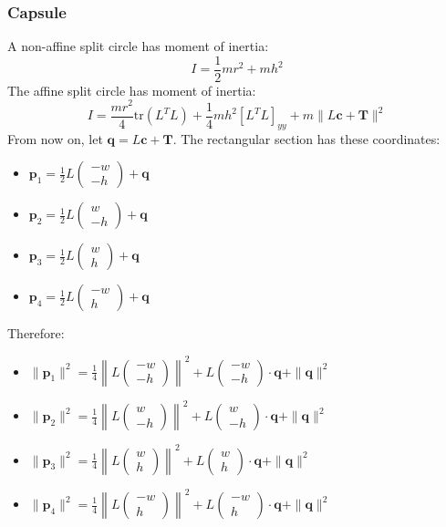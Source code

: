 \documentclass[10pt]{report}
\newcommand{\mat}[1]{\begin{pmatrix} #1 \end{pmatrix}}
\begin{document}
\subsubsection{Capsule}
A non-affine split circle has moment of inertia:
\begin{equation}I=\frac{1}{2}mr^2+mh^2\end{equation}
The affine split circle has moment of inertia:
\begin{equation}I=\frac{mr^2}{4}\mbox{tr}(L^TL)+\frac{1}{4}mh^2[L^TL]_{yy}+m\|L\boldsymbol{c}+\boldsymbol{T}\|^2\end{equation}
From now on, let $\boldsymbol{q}=L\boldsymbol{c}+\boldsymbol{T}$. The rectangular section has these coordinates:
\begin{itemize}
\item $\boldsymbol{p}_1=\frac{1}{2}L\mat{-w\\-h}+\boldsymbol{q}$
\item $\boldsymbol{p}_2=\frac{1}{2}L\mat{w\\-h}+\boldsymbol{q}$
\item $\boldsymbol{p}_3=\frac{1}{2}L\mat{w\\h}+\boldsymbol{q}$
\item $\boldsymbol{p}_4=\frac{1}{2}L\mat{-w\\h}+\boldsymbol{q}$
\end{itemize}
Therefore:
\begin{itemize}
\item $\|\boldsymbol{p}_1\|^2=\frac{1}{4}\left\|L\mat{-w\\-h}\right\|^2+L\mat{-w\\-h}\cdot\boldsymbol{q}+\|\boldsymbol{q}\|^2$
\item $\|\boldsymbol{p}_2\|^2=\frac{1}{4}\left\|L\mat{w\\-h}\right\|^2+L\mat{w\\-h}\cdot\boldsymbol{q}+\|\boldsymbol{q}\|^2$
\item $\|\boldsymbol{p}_3\|^2=\frac{1}{4}\left\|L\mat{w\\h}\right\|^2+L\mat{w\\h}\cdot\boldsymbol{q}+\|\boldsymbol{q}\|^2$
\item $\|\boldsymbol{p}_4\|^2=\frac{1}{4}\left\|L\mat{-w\\h}\right\|^2+L\mat{-w\\h}\cdot\boldsymbol{q}+\|\boldsymbol{q}\|^2$
\end{itemize}
\end{document}

